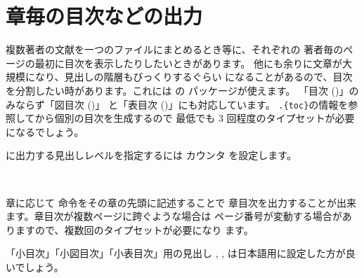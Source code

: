 \section{章毎の目次などの出力\texorpdfstring{\zdash}{---}}
複数著者の文献を一つのファイルにまとめるとき等に、それぞれの
著者毎のページの最初に目次を表示したりしたいときがあります。
他にも余りに文章が大規模になり、見出しの階層もびっくりするぐらい
になることがあるので、目次を分割したい時があります。これには
 の  パッケージが使えます。
「目次 ()」のみならず「図目次 ()」
と「表目次 ()」にも対応しています。
\verb|.{toc}|の情報を参照してから個別の目次を生成するので
最低でも 3 回程度のタイプセットが必要になるでしょう。

に出力する見出しレベルを指定するには カウンタ 
を設定します。
\begin{Syntax}
  \\
 
\end{Syntax}
章に応じて  命令をその章の先頭に記述することで
章目次を出力することが出来ます。章目次が複数ページに跨ぐような場合は
ページ番号が変動する場合がありますので、複数回のタイプセットが必要になり
ます。

「小目次」「小図目次」「小表目次」用の見出し , ,
 は日本語用に設定した方が良いでしょう。


